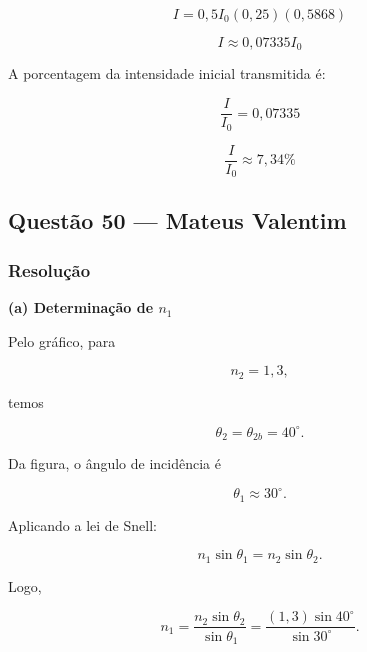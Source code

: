 \documentclass[12pt,a4paper]{article}
\begin{document}
\[
I = 0,5 I_0 (0,25) (0,5868)
\]

\[
I \approx 0,07335 I_0
\]

A porcentagem da intensidade inicial transmitida é:

\[
\frac{I}{I_0} = 0,07335
\]

\[
\boxed{\frac{I}{I_0} \approx 7,34\%}
\]

\subsection{Questão 50 — Mateus Valentim}


\subsubsection{Resolução}



\textbf{(a) Determinação de \(n_1\)}



Pelo gráfico, para



\[

n_2=1{,}3,

\]



temos



\[

\theta_2=\theta_{2b}=40^\circ.

\]



Da figura, o ângulo de incidência é



\[

\theta_1 \approx 30^\circ.

\]



Aplicando a lei de Snell:



\[

n_1\sin\theta_1=n_2\sin\theta_2.

\]



Logo,



\[

n_1=\frac{n_2\sin\theta_2}{\sin\theta_1}

=\frac{(1{,}3)\sin40^\circ}{\sin30^\circ}.

\]
\end{document}
